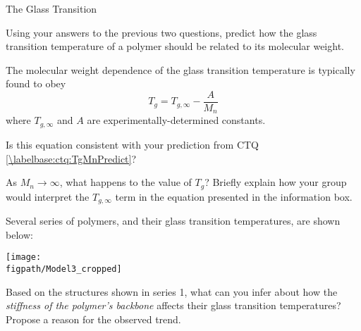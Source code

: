 \begin{activity}{The Glass Transition}
\begin{ctqs}
	\question Using your answers to the previous two questions, predict how the glass transition temperature of a polymer should be related to its molecular weight. \label{\labelbase:ctq:TgMnPredict}
	
		\begin{solution}[1in]
		\end{solution}
	
\end{ctqs}

\begin{infobox}

	The molecular weight dependence of the glass transition temperature is typically found to obey
	\begin{equation*}
		T_g = T_{g,\infty} - \frac{A}{M_n}
	\end{equation*}
	where $T_{g,\infty}$ and $A$ are experimentally-determined constants.
\end{infobox}

\begin{ctqs}
	\question Is this equation consistent with your prediction from CTQ \ref{\labelbase:ctq:TgMnPredict}?
	
		\begin{solution}[0.5in]
		\end{solution}
	
	\question As $M_n\to\infty$, what happens to the value of $T_g$?  Briefly explain how your group would interpret the $T_{g,\infty}$ term in the equation presented in the information box.
	
		\begin{solution}[1in]
		\end{solution}
	
\end{ctqs}

\begin{model}
	\label{\labelbase:mdl:Tgdeterminants}

	Several series of polymers, and their glass transition temperatures, are shown below:
	
	\centerline{\texttt{[image: \\figpath/Model3\_cropped]}}
	
\end{model}

\begin{ctqs}
	
	\question Based on the structures shown in series 1, what can you infer about how the \emph{stiffness of the polymer's backbone} affects their glass transition temperatures?  Propose a reason for the observed trend.
	

\end{ctqs}
\end{activity}
